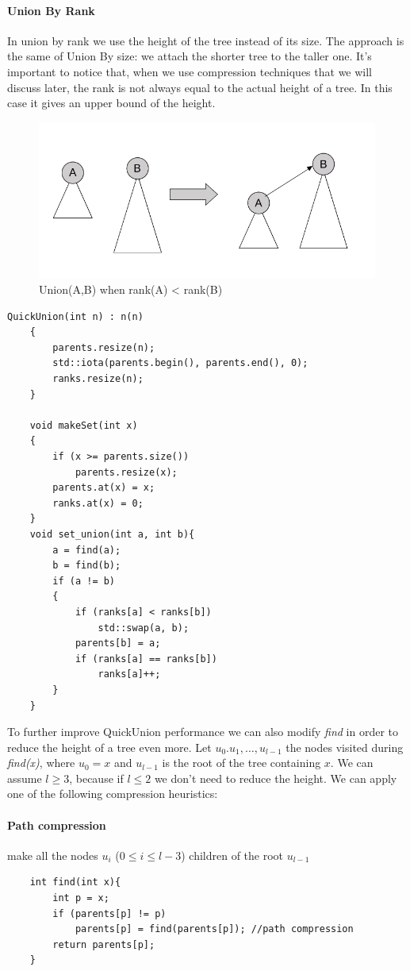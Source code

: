 \documentclass{article}
\begin{document}
\paragraph{Union By Rank} In union by rank we use the height of the tree instead
of its size. The approach is the same of Union By size: we attach the shorter tree
to the taller one. It's important to notice that, when we use compression techniques that we will discuss later, the rank is not always equal to the actual height of a tree. 
In this case it gives an upper bound of the height.  
\begin{figure}[h!]
    \includegraphics[width=0.9\linewidth]{img/urank.png}
    \caption{Union(A,B) when rank(A) < rank(B)}
    \label{fig:urank}
\end{figure}
\begin{lstlisting}[caption=QuickUnion using Union by Rank]
    QuickUnion(int n) : n(n)
    {
        parents.resize(n);
        std::iota(parents.begin(), parents.end(), 0);
        ranks.resize(n);
    }

    void makeSet(int x)
    {
        if (x >= parents.size())
            parents.resize(x);
        parents.at(x) = x;
        ranks.at(x) = 0;
    }
    void set_union(int a, int b){
        a = find(a);
        b = find(b);
        if (a != b)
        {
            if (ranks[a] < ranks[b])
                std::swap(a, b);
            parents[b] = a;
            if (ranks[a] == ranks[b])
                ranks[a]++;
        }
    }
\end{lstlisting}
To further improve QuickUnion performance we can also modify \emph{find} in order to reduce the height of a tree
even more. Let $u_0. u_1, \dots, u_{l-1}$ the nodes visited during \emph{find(x)}, where $u_0 = x$ and $u_{l-1}$ is
the root of the tree containing $x$. We can assume $l \geq 3$, because if $l\leq 2$ we don't need to reduce the height.
We can apply one of the following compression heuristics:
\paragraph{Path compression} \cite{hopcroft1973set} make all the nodes $u_i$ ($ 0 \leq i \leq l-3$) children of the root $u_{l-1}$
\begin{lstlisting}
    int find(int x){
        int p = x;
        if (parents[p] != p)
            parents[p] = find(parents[p]); //path compression
        return parents[p];
    }
\end{lstlisting}
\end{document}
